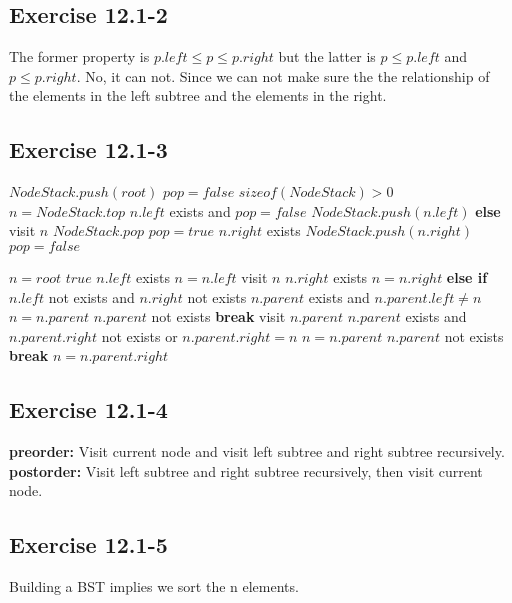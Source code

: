 \documentclass[12pt]{article}
\theoremstyle{definition}
\theoremstyle{remark}
\begin{document}
\subsection*{Exercise 12.1-2}
The former property is $p.left\le p\le p.right$ but the latter is $p\le p.left$ and $p\le p.right$. No, it can not. Since we can not make sure the the relationship of the elements in the left subtree and the elements in the right.
\subsection*{Exercise 12.1-3}
\begin{codebox}
\li $NodeStack.push(root)$
\li $pop=false$
\li \While $sizeof(NodeStack)>0$ \label{li:while}
\li \quad $n=NodeStack.top$
\li \quad \If $n.left$ exists and $pop = false$ \label{li:if}
\li \qquad $NodeStack.push(n.left)$
\li \quad \textbf{else}
\li \qquad visit $n$
\li \qquad $NodeStack.pop$
\li \qquad $pop = true$
\li \qquad \If $n.right$ exists \label{li:if}
\li \quad \qquad $NodeStack.push(n.right)$
\li \quad \qquad $pop = false$
\end{codebox}
\begin{codebox}
\li $n=root$
\li \While $true$ \label{li:while}
\li \quad \While $n.left$ exists \label{li:while}
\li \qquad $n=n.left$
\li \quad visit $n$
\li \quad \If $n.right$ exists \label{li:if}
\li \qquad $n=n.right$
\li \quad \textbf{else if} $n.left$ not exists and $n.right$ not exists
\li \qquad \While $n.parent$ exists and $n.parent.left\ne n$
\li \qquad \quad $n=n.parent$
\li \qquad \If $n.parent$ not exists \label{li:if}
\li \qquad \quad \textbf{break}
\li \qquad visit $n.parent$
\li \qquad \While $n.parent$ exists and $n.parent.right$ not exists or $n.parent.right=n$
\li \qquad \quad $n=n.parent$
\li \qquad \If $n.parent$ not exists \label{li:if}
\li \qquad \quad \textbf{break}
\li \qquad $n=n.parent.right$
\end{codebox}
\subsection*{Exercise 12.1-4}
\textbf{preorder:} Visit current node and visit left subtree and right subtree recursively.\\
\textbf{postorder:} Visit left subtree and right subtree recursively, then visit current node.
\subsection*{Exercise 12.1-5}
Building a BST implies we sort the n elements.
\end{document}
